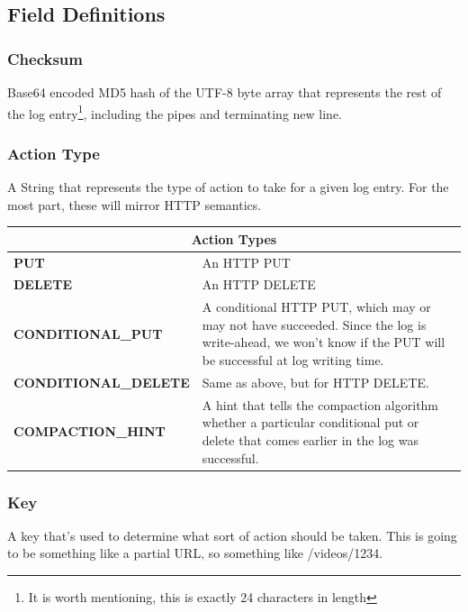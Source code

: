 \documentclass[11pt]{article}
\begin{document}
\subsection{Field Definitions}

\subsubsection{Checksum}
Base64 encoded MD5 hash of the UTF-8 byte array that represents the rest of the log entry\footnote{It is worth mentioning, this is exactly 24 characters in length}, including the pipes and terminating new line.

\subsubsection{Action Type}
A String that represents the type of action to take for a given log entry.  For the most part, these will mirror HTTP semantics.

\begin{center}
\begin{tabular}{|l|p{3.5in}|}
\hline
\multicolumn{2}{|c|}{Action  Types}\\ \hline
\textbf{PUT} & An HTTP PUT\\ \hline
\textbf{DELETE} & An HTTP DELETE\\ \hline
\textbf{CONDITIONAL\_PUT} & A conditional HTTP PUT, which may or may not have succeeded.   Since the log is write-ahead, we won’t know if the PUT will be successful at log writing time.\\ \hline
\textbf{CONDITIONAL\_DELETE} & Same as above, but for HTTP DELETE.\\ \hline
\textbf{COMPACTION\_HINT} & A hint that tells the compaction algorithm whether a particular conditional put or delete that comes earlier in the log was successful.\\ \hline
\end{tabular}
\end{center}

\subsubsection{Key}
A key that’s used to determine what sort of action should be taken.  This is going to be something like a partial URL, so something like /videos/1234.
\end{document}
